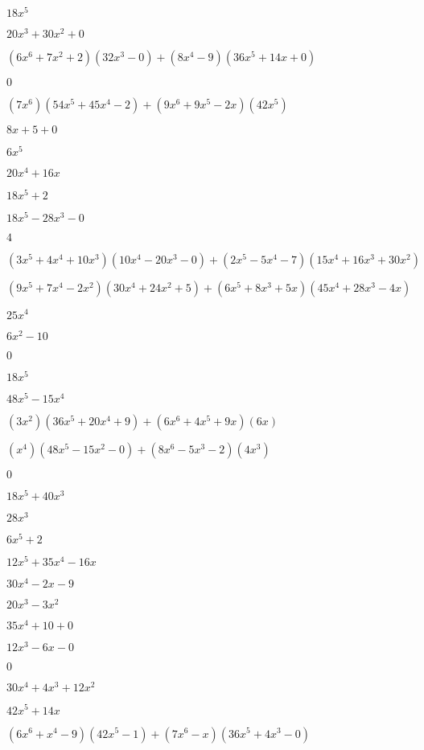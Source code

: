 \documentclass{article}
\begin{document}
\begin{multicols}{2}
$18x^{5}$\item $20x^{3}+30x^{2}+0$\item $(6x^{6}+7x^2+2)(32x^{3}-0)+(8x^{4}-9)(36x^{5}+14x+0)$\item $0$\item $(7x^{6})(54x^{5}+45x^{4}-2)+(9x^{6}+9x^{5}-2x)(42x^{5})$\item $8x+5+0$\item $6x^{5}$\item $20x^{4}+16x$\item $18x^{5}+2$\item $18x^{5}-28x^{3}-0$\item $4$\item $(3x^{5}+4x^{4}+10x^{3})(10x^{4}-20x^{3}-0)+(2x^{5}-5x^{4}-7)(15x^{4}+16x^{3}+30x^{2})$\item $(9x^{5}+7x^{4}-2x^2)(30x^{4}+24x^{2}+5)+(6x^{5}+8x^{3}+5x)(45x^{4}+28x^{3}-4x)$\item $25x^{4}$\item $6x^{2}-10$\item $0$\item $18x^{5}$\item $48x^{5}-15x^{4}$\item $(3x^2)(36x^{5}+20x^{4}+9)+(6x^{6}+4x^{5}+9x)(6x)$\item $(x^{4})(48x^{5}-15x^{2}-0)+(8x^{6}-5x^{3}-2)(4x^{3})$\item $0$\item $18x^{5}+40x^{3}$\item $28x^{3}$\item $6x^{5}+2$\item $12x^{5}+35x^{4}-16x$\item $30x^{4}-2x-9$\item $20x^{3}-3x^{2}$\item $35x^{4}+10+0$\item $12x^{3}-6x-0$\item $0$\item $30x^{4}+4x^{3}+12x^{2}$\item $42x^{5}+14x$\item $(6x^{6}+x^{4}-9)(42x^{5}-1)+(7x^{6}-x)(36x^{5}+4x^{3}-0)$\item 
\end{multicols}
\end{document}
